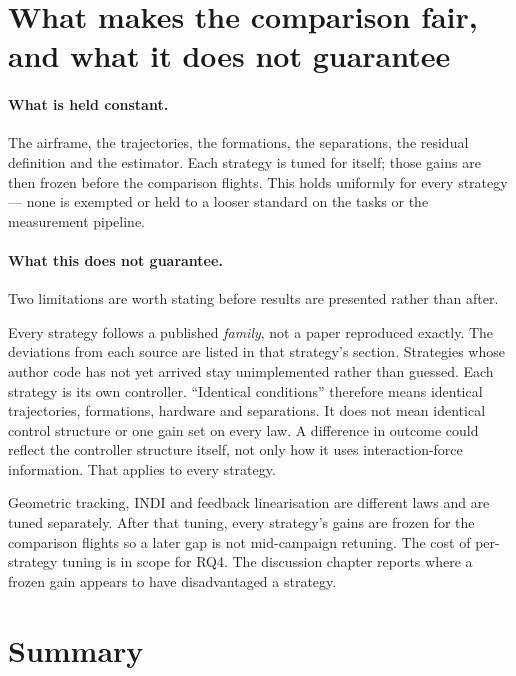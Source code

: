 \section{What makes the comparison fair, and what it does not guarantee}
\label{sec:ctrl-fairness}



\paragraph{What is held constant.} The airframe, the trajectories, the formations, the
separations, the residual definition and the estimator. Each strategy is tuned for itself; those
gains are then frozen before the comparison flights. This holds uniformly for every strategy — none
is exempted or held to a looser standard on the tasks or the measurement pipeline.

\paragraph{What this does not guarantee.} Two limitations are worth stating before results are
presented rather than after.

Every strategy follows a published \emph{family}, not a paper reproduced exactly. The deviations
from each source are listed in that strategy's section. Strategies whose author code has not yet
arrived stay unimplemented rather than guessed. Each strategy is its own controller. ``Identical
conditions'' therefore means identical trajectories, formations, hardware and separations. It does
not mean identical control structure or one gain set on every law. A difference in outcome could
reflect the controller structure itself, not only how it uses interaction-force information. That
applies to every strategy.

Geometric tracking, INDI and feedback linearisation are different laws and are tuned separately.
After that tuning, every strategy's gains are frozen for the comparison flights so a later gap is
not mid-campaign retuning. The cost of per-strategy tuning is in scope for RQ4. The discussion
chapter reports where a frozen gain appears to have disadvantaged a strategy.

\section{Summary}
\label{sec:ctrl-summary}

